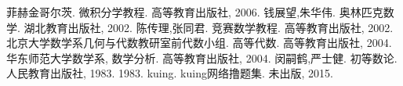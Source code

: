 
\begin{thebibliography}{99}
    菲赫金哥尔茨. 微积分学教程. 高等教育出版社, 2006.
    钱展望,朱华伟. 奥林匹克数学. 湖北教育出版社, 2002.
    陈传理,张同君. 竞赛数学教程. 高等教育出版社, 2002.
    北京大学数学系几何与代数教研室前代数小组. 高等代数. 高等教育出版社, 2004.
    华东师范大学数学系, 数学分析. 高等教育出版社, 2004.
    闵嗣鹤,严士健. 初等数论. 人民教育出版社, 1983. 1983.
    kuing. kuing网络撸题集. 未出版, 2015.
\end{thebibliography}


